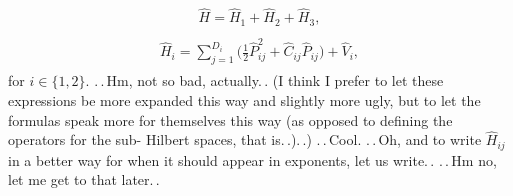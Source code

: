 \documentclass{report}
\begin{document}
\begin{align}
\begin{aligned}
	\hat H = \hat H_{1} + \hat H_{2} + \hat H_3,
\end{aligned}
\end{align}
\begin{align}
\begin{aligned}
	\hat H_{i} = 
		\sum_{j=1}^{D_i} \big(
			\frac{1}{2} \hat P_{ij}^2 + 
			\hat C_{ij} \hat P_{ij}
		\big) +
		\hat V_{i} ,
	\label{H_i_01}
\end{aligned}
\end{align} 
for $i\in\{1,2\}$. .\,.\,Hm, not so bad, actually.\,. (I think I prefer to let these expressions be more expanded this way and slightly more ugly, but to let the formulas speak more for themselves this way (as opposed to defining the operators for the sub- Hilbert spaces, that is.\,.).\,.) .\,.\,Cool. 
.\,.\,Oh, and to write $\hat H_{ij}$ in a better way for when it should appear in exponents, let us write.\,. .\,.\,Hm no, let me get to that later.\,. 
\end{document}

